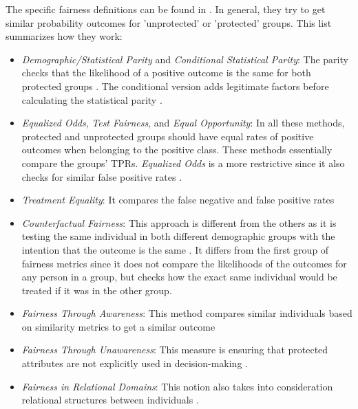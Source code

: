 \documentclass[12pt, a4paper, oneside]{book}   	%
\begin{document}
\begin{appendices}
			The specific fairness definitions can be found in \textcite{Mehrabi_2021}. In general, they try to get similar probability outcomes for 'unprotected' or 'protected' groups. This list summarizes how they work:
			\begin{itemize}
				\item \textit{Demographic/Statistical Parity} and \textit{Conditional Statistical Parity}: The parity checks that the likelihood of a positive outcome is the same for both protected groups \autocite{M48_Dwork_2012,Mehrabi_2021}. The conditional version adds legitimate factors before calculating the statistical parity \autocite{M41_Corbett-Davies_2017}.
				
				\item \textit{Equalized Odds}, \textit{Test Fairness}, and \textit{Equal Opportunity}: In all these methods, protected and unprotected groups should have equal rates of positive outcomes when belonging to the positive class. These methods essentially compare the groups' \glspl{TPR}. \textit{Equalized Odds} is a more restrictive since it also checks for similar false positive rates \autocite{M149_Verma_2018,Mehrabi_2021}.
				
				\item \textit{Treatment Equality}: It compares the false negative and false positive rates \autocite{M151_Wang_2014}
				
				\item \textit{Counterfactual Fairness}: This approach is different from the others as it is testing the same individual in both different demographic groups with the intention that the outcome is the same \autocite{M87_Kusner_2017,Mehrabi_2021}. It differs from the first group of fairness metrics since it does not compare the likelihoods of the outcomes for any person in a group, but checks how the exact same individual would be treated if it was in the other group.
				
				\item \textit{Fairness Through Awareness}: This method compares similar individuals based on similarity metrics to get a similar outcome \autocite{M48_Dwork_2012,Mehrabi_2021}
				
				\item \textit{Fairness Through Unawareness}: This measure is ensuring that protected attributes are not explicitly used in decision-making \autocite{M61_Grgic-Hlaca_2016, M87_Kusner_2017}.
				
				\item \textit{Fairness in Relational Domains}: This notion also takes into consideration relational structures between individuals \autocite{M50_Farnadi_2018}.
			\end{itemize}
			

\end{appendices}
\end{document}
